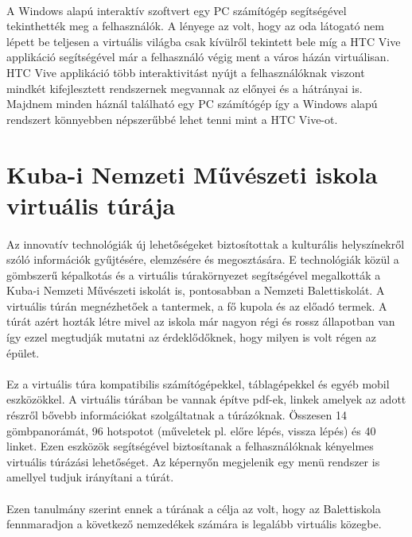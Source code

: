 \paragraph{}
A Windows alapú interaktív szoftvert egy PC számítógép segítségével tekinthették meg a felhasználók. A lényege az volt, hogy az oda látogató nem lépett be teljesen a virtuális világba csak kívülről tekintett bele míg a HTC Vive applikáció segítségével már a felhasználó végig ment a város házán virtuálisan. HTC Vive applikáció több interaktivitást nyújt a felhasználóknak viszont mindkét kifejlesztett rendszernek megvannak az előnyei és a hátrányai is. Majdnem minden háznál található egy PC számítógép így a Windows alapú rendszert könnyebben népszerűbbé lehet tenni mint a HTC Vive-ot.

\section{Kuba-i Nemzeti Művészeti iskola virtuális túrája}
\paragraph{}
Az innovatív technológiák új lehetőségeket biztosítottak a kulturális helyszínekről szóló információk gyűjtésére, elemzésére és megosztására. E technológiák közül a gömbszerű képalkotás és a virtuális túrakörnyezet segítségével megalkották a Kuba-i Nemzeti Művészeti iskolát \cite{napolitano2017virtual} is, pontosabban a Nemzeti Balettiskolát. A virtuális túrán megnézhetőek a tantermek, a fő kupola és az előadó termek. A túrát azért hozták létre mivel az iskola már nagyon régi és rossz állapotban van így ezzel megtudják mutatni az érdeklődőknek, hogy milyen is volt régen az épület.
\paragraph{}
Ez a virtuális túra kompatibilis számítógépekkel, táblagépekkel és egyéb mobil eszközökkel. A virtuális túrában be vannak építve pdf-ek, linkek amelyek az adott részről bővebb információkat szolgáltatnak a túrázóknak. Összesen 14 gömbpanorámát, 96 hotspotot (műveletek pl. előre lépés, vissza lépés) és 40 linket. Ezen eszközök segítségével biztosítanak a felhasználóknak kényelmes virtuális túrázási lehetőséget. Az képernyőn megjelenik egy menü rendszer is amellyel tudjuk irányítani a túrát.
\paragraph{}
Ezen tanulmány szerint ennek a túrának a célja az volt, hogy az Balettiskola fennmaradjon a következő nemzedékek számára is legalább virtuális közegbe. 

